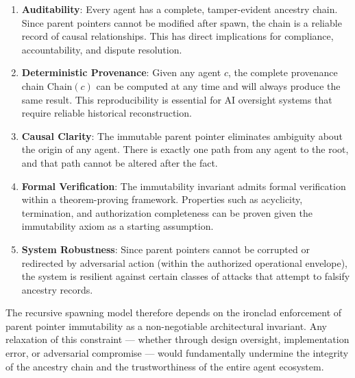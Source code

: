 \begin{enumerate}
\item \textbf{Auditability}: Every agent has a complete, tamper-evident ancestry chain. Since parent pointers cannot be modified after spawn, the chain is a reliable record of causal relationships. This has direct implications for compliance, accountability, and dispute resolution.

\item \textbf{Deterministic Provenance}: Given any agent $c$, the complete provenance chain $\text{Chain}(c)$ can be computed at any time and will always produce the same result. This reproducibility is essential for AI oversight systems that require reliable historical reconstruction.

\item \textbf{Causal Clarity}: The immutable parent pointer eliminates ambiguity about the origin of any agent. There is exactly one path from any agent to the root, and that path cannot be altered after the fact.

\item \textbf{Formal Verification}: The immutability invariant admits formal verification within a theorem-proving framework. Properties such as acyclicity, termination, and authorization completeness can be proven given the immutability axiom as a starting assumption.

\item \textbf{System Robustness}: Since parent pointers cannot be corrupted or redirected by adversarial action (within the authorized operational envelope), the system is resilient against certain classes of attacks that attempt to falsify ancestry records.
\end{enumerate}

The recursive spawning model therefore depends on the ironclad enforcement of parent pointer immutability as a non-negotiable architectural invariant. Any relaxation of this constraint — whether through design oversight, implementation error, or adversarial compromise — would fundamentally undermine the integrity of the ancestry chain and the trustworthiness of the entire agent ecosystem.

